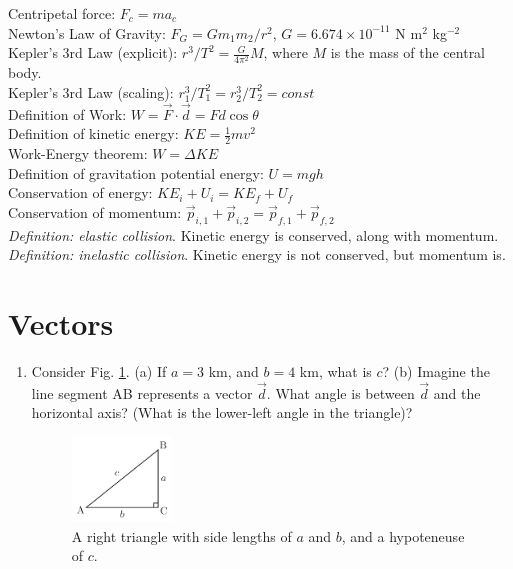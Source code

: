 \documentclass[10pt]{article}
\begin{document}
Centripetal force: $F_c = m a_c$ \\
Newton's Law of Gravity: $F_G = G m_1 m_2 / r^2$, $G = 6.674\times 10^{-11}$ N m$^2$ kg$^{-2}$ \\
Kepler's 3rd Law (explicit): $r^3/T^2 = \frac{G}{4\pi^2} M$, where $M$ is the mass of the central body. \\
Kepler's 3rd Law (scaling): $r_1^3/T_1^2 = r_2^3/T_2^2 = const$ \\
Definition of Work: $W = \vec{F} \cdot \vec{d} = Fd\cos\theta$ \\
Definition of kinetic energy: $KE = \frac{1}{2} mv^2$ \\
Work-Energy theorem: $W = \Delta KE$ \\
Definition of gravitation potential energy: $U = mgh$ \\
Conservation of energy: $KE_i + U_i = KE_f + U_f$ \\
Conservation of momentum: $\vec{p}_{i,1} + \vec{p}_{i,2} = \vec{p}_{f,1} + \vec{p}_{f,2}$ \\
\textit{Definition: elastic collision}. Kinetic energy is conserved, along with momentum. \\
\textit{Definition: inelastic collision}. Kinetic energy is not conserved, but momentum is. \\

\section{Vectors}
\begin{enumerate}
\item Consider Fig. \ref{fig:tri}.  (a) If $a=3$ km, and $b=4$ km, what is $c$? (b) Imagine the line segment AB represents a vector $\vec{d}$.  What angle is between $\vec{d}$ and the horizontal axis? (What is the lower-left angle in the triangle)?
\begin{figure}[hb]
\centering
\includegraphics[width=0.25\textwidth]{figures/tri.png}
\caption{\label{fig:tri} A right triangle with side lengths of $a$ and $b$, and a hypoteneuse of $c$.}
\end{figure}
\end{enumerate}
\end{document}
